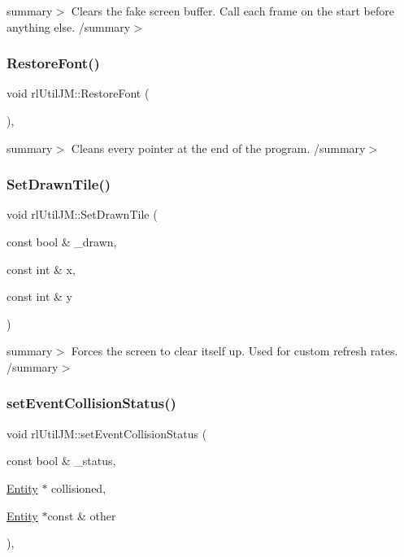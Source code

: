 summary$>$ Clears the fake screen buffer. Call each frame on the start before anything else. /summary$>$ \mbox{\label{classrl_util_j_m_adc81711e284db4c813ec7055eab05ad7}} 
\subsubsection{\texorpdfstring{Restore\+Font()}{RestoreFont()}}
{\footnotesize\ttfamily void rl\+Util\+J\+M\+::\+Restore\+Font (\begin{DoxyParamCaption}{ }\end{DoxyParamCaption})\hspace{0.3cm}{\ttfamily [static]}, {\ttfamily [protected]}}

summary$>$ Cleans every pointer at the end of the program. /summary$>$ \mbox{\label{classrl_util_j_m_a9c4237973b2b58d8184e423da86c3bcb}} 
\subsubsection{\texorpdfstring{Set\+Drawn\+Tile()}{SetDrawnTile()}}
{\footnotesize\ttfamily void rl\+Util\+J\+M\+::\+Set\+Drawn\+Tile (\begin{DoxyParamCaption}\item[{const bool \&}]{\+\_\+drawn,  }\item[{const int \&}]{x,  }\item[{const int \&}]{y }\end{DoxyParamCaption})\hspace{0.3cm}{\ttfamily [static]}}

summary$>$ Forces the screen to clear itself up. Used for custom refresh rates. /summary$>$ \mbox{\label{classrl_util_j_m_a1f75535f3200ef421bb28afd77358627}} 
\subsubsection{\texorpdfstring{set\+Event\+Collision\+Status()}{setEventCollisionStatus()}}
{\footnotesize\ttfamily void rl\+Util\+J\+M\+::set\+Event\+Collision\+Status (\begin{DoxyParamCaption}\item[{const bool \&}]{\+\_\+status,  }\item[{\hyperlink{class_entity}{Entity} $\ast$}]{collisioned,  }\item[{\hyperlink{class_entity}{Entity} $\ast$const \&}]{other }\end{DoxyParamCaption})\hspace{0.3cm}{\ttfamily [static]}, {\ttfamily [private]}}

